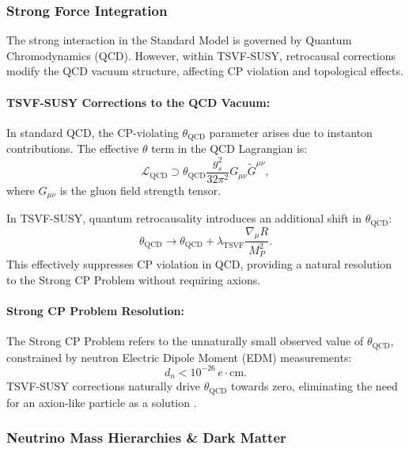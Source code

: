 \documentclass[twocolumn,superscriptaddress,floatfix]{revtex4-2}
\begin{document}
\subsubsection{Strong Force Integration}
\label{subsec:strong_force}

The strong interaction in the Standard Model is governed by Quantum Chromodynamics (QCD). However, within TSVF-SUSY, retrocausal corrections modify the QCD vacuum structure, affecting CP violation and topological effects.

\paragraph{TSVF-SUSY Corrections to the QCD Vacuum:}
In standard QCD, the CP-violating $\theta_{\text{QCD}}$ parameter arises due to instanton contributions. The effective $\theta$ term in the QCD Lagrangian is:
\begin{equation}
\mathcal{L}_{\text{QCD}} \supset \theta_{\text{QCD}} \frac{g_s^2}{32\pi^2} G_{\mu\nu} \tilde{G}^{\mu\nu},
\end{equation}
where $G_{\mu\nu}$ is the gluon field strength tensor.

In TSVF-SUSY, quantum retrocausality introduces an additional shift in $\theta_{\text{QCD}}$:
\begin{equation}  
\theta_{\text{QCD}} \to \theta_{\text{QCD}} + \lambda_{\text{TSVF}} \frac{\nabla_\mu R}{M_P^2}.  
\label{eq:theta_qcd_tsvf}
\end{equation}
This effectively suppresses CP violation in QCD, providing a natural resolution to the Strong CP Problem without requiring axions.

\paragraph{Strong CP Problem Resolution:}
The Strong CP Problem refers to the unnaturally small observed value of $\theta_{\text{QCD}}$, constrained by neutron Electric Dipole Moment (EDM) measurements:
\begin{equation}
d_n < 10^{-26} \, e \cdot \text{cm}.
\end{equation}
TSVF-SUSY corrections naturally drive $\theta_{\text{QCD}}$ towards zero, eliminating the need for an axion-like particle as a solution \cite{Peccei1977}.


\subsubsection{Neutrino Mass Hierarchies \& Dark Matter}
\label{subsec:neutrino_darkmatter}
\end{document}
